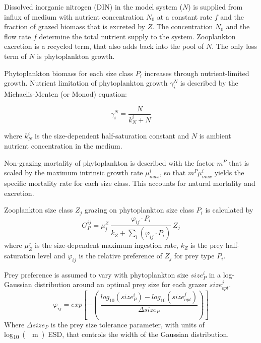 \documentclass[journal abbreviation, manuscript]{copernicus}
\begin{document}
Dissolved inorganic nitrogen (DIN) in the model system ($N$) is supplied from influx of medium with nutrient concentration $N_0$ at a constant rate $f$ and the fraction of grazed biomass that is excreted by $Z$. The concentration $N_0$ and the flow rate $f$ determine the total nutrient supply to the system. Zooplankton excretion is a recycled term, that also adds back into the pool of $N$. The only loss term of $N$ is phytoplankton growth.

Phytoplankton biomass for each size class $P_i$ increases through nutrient-limited growth. Nutrient limitation of phytoplankton growth $\gamma_i^N$ is described by the Michaelis-Menten (or Monod) equation:

\begin{equation}
    \gamma_i^N =  \frac{N}{k_N^i + N} 
\end{equation}

where $k_N^i$ is the size-dependent half-saturation constant and $N$ is ambient nutrient concentration in the medium.

Non-grazing mortality of phytoplankton is described with the factor $m^P$ that is scaled by the maximum intrinsic growth rate $\mu_{max}^i$, so that $m^P \mu_{max}^i$ yields the specific mortality rate for each size class. This accounts for natural mortality and excretion.

Zooplankton size class $Z_j$ grazing on phytoplankton size class $P_i$ is calculated by
\begin{equation}
    G_P^{ij} = \mu_j^Z \ \frac{ \varphi_{ij} \cdot P_i }{ k_Z + \sum_{i}(\varphi_{ij} \cdot P_i) } \ Z_j
\end{equation}
where $\mu_Z^j$ is the size-dependent maximum ingestion rate, $k_Z$ is the prey half-saturation level and $\varphi_{ij}$ is the relative preference of $Z_j$ for prey type $P_i$.

Prey preference is assumed to vary with phytoplankton size $size_{P}^i$ in a log-Gaussian distribution around an optimal prey size for each grazer $size_{opt}^j$.
\begin{equation}
    \varphi_{ij} = exp \left[ -\left( \ \frac{ log_{10}(size_P^i) - log_{10}(size_{opt}^j) }{ \Delta size_{P} } \right) \right]
\end{equation}
Where $\Delta size_{P}$ is the prey size tolerance parameter, with units of \unit{log_{10}(\mu m) ESD}, that controls the width of the Gaussian distribution.
\end{document}
